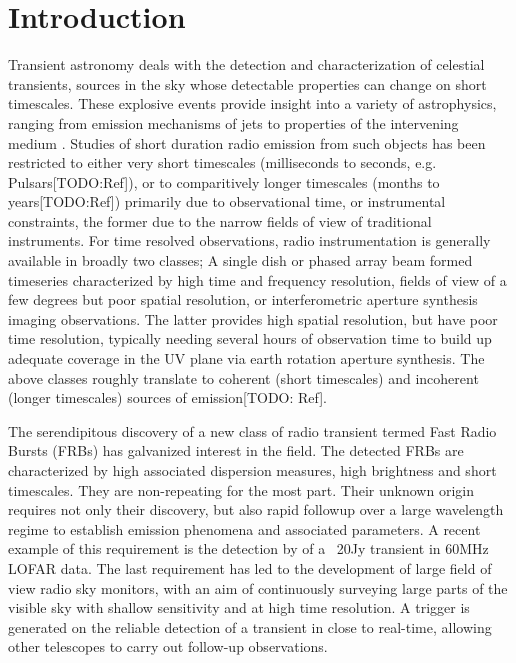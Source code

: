 \documentclass{ws-jai}
\begin{document}
\section{\label{sec:Introduction}Introduction}

\noindent Transient astronomy  deals with the detection  and characterization of
celestial transients, sources in the  sky whose detectable properties can change
on short timescales.   These explosive events provide insight into  a variety of
astrophysics,  ranging from  emission mechanisms  of jets  to properties  of the
intervening  medium \citep{fender2006lofar,lazio2009dynamic}.  Studies of  short
duration radio  emission from such  objects has  been restricted to  either very
short  timescales  (milliseconds to  seconds,  e.g.   Pulsars[TODO:Ref]), or  to
comparitively  longer timescales  (months to  years[TODO:Ref]) primarily  due to
observational time,  or instrumental constraints,  the former due to  the narrow
fields  of view  of traditional  instruments.  For  time resolved  observations,
radio instrumentation  is generally available  in broadly two classes;  A single
dish  or phased  array beam  formed timeseries  characterized by  high time  and
frequency  resolution,  fields  of  view  of a  few  degrees  but  poor  spatial
resolution,  or interferometric  aperture synthesis  imaging observations.   The
latter  provides  high  spatial  resolution,  but  have  poor  time  resolution,
typically  needing  several hours  of  observation  time  to build  up  adequate
coverage  in the  UV plane  via earth  rotation aperture  synthesis.  The  above
classes roughly translate to coherent  (short timescales) and incoherent (longer
timescales) sources of emission[TODO: Ref].

The serendipitous discovery of a new  class of radio transient termed Fast Radio
Bursts  (FRBs)\citep{spitler2015fast,   thornton2013population}  has  galvanized
interest in the  field.  The detected FRBs are characterized  by high associated
dispersion   measures,  high   brightness  and   short  timescales.    They  are
non-repeating for  the most part. Their  unknown origin requires not  only their
discovery, but also  rapid followup over a large wavelength  regime to establish
emission  phenomena  and  associated  parameters.   A  recent  example  of  this
requirement is the detection by  \cite{stewart2016lofar} of a ~20Jy transient in
60MHz LOFAR  data.  The  last requirement  has led to  the development  of large
field of  view radio sky monitors,  with an aim of  continuously surveying large
parts of the visible sky with shallow sensitivity and at high time resolution. A
trigger  is generated  on the  reliable  detection of  a transient  in close  to
real-time, allowing other telescopes to carry out follow-up observations.
\end{document}
